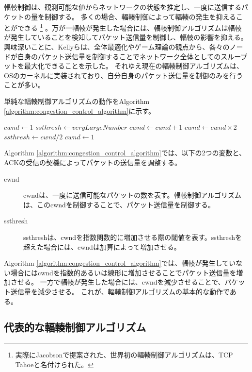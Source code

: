 \documentclass[a4paper,11pt]{jreport}
\newcommand{\algorithmref}[1]{Algorithm \ref{#1}}
\begin{document}
輻輳制御\cite{congestion-avoidance}は、観測可能な値からネットワークの状態を推定し、一度に送信するパケットの量を制御する。
多くの場合、輻輳制御によって輻輳の発生を抑えることができる
\footnote{実際にJacobson\cite{congestion-avoidance}で提案された、世界初の輻輳制御アルゴリズムは、TCP Tahoeと名付けられた。}
。万が一輻輳が発生した場合には、輻輳制御アルゴリズムは輻輳が発生していることを検知してパケット送信量を制御し、輻輳の影響を抑える。
興味深いことに、Kellyら\cite{kelly1998rate}は、全体最適化やゲーム理論の観点から、各々のノードが自身のパケット送信量を制御することでネットワーク全体としてのスループットを最大化できることを示した。
それゆえ現在の輻輳制御アルゴリズムは、OSのカーネルに実装されており、自分自身のパケット送信量を制御のみを行うことが多い。

単純な輻輳制御アルゴリズムの動作を\algorithmref{algorithm:congestion_control_algorithm}に示す。
\begin{algorithm}
  \caption{Basic Congestion Control Algorithm}
  \label{algorithm:congestion_control_algorithm}
  \begin{algorithmic}[1]
  \State $cwnd \gets 1$
  \State $ssthresh \gets veryLargeNumber$
            \State $cwnd \gets cwnd + 1$
        \Else
            \State $cwnd \gets cwnd \times 2$
        \EndIf
      \EndIf
          \State $ssthresh \gets cwnd / 2$
          \State $cwnd \gets 1$
      \EndIf
  \EndWhile
  \end{algorithmic}
\end{algorithm}
\algorithmref{algorithm:congestion_control_algorithm}では、以下の2つの変数と、ACKの受信の契機によってパケットの送信量を調整する。

\begin{description}
  \item[cwnd] cwndは、一度に送信可能なパケットの数を表す。輻輳制御アルゴリズムは、このcwndを制御することで、パケット送信量を制御する。
  \item[ssthresh] ssthreshは、cwndを指数関数的に増加させる際の閾値を表す。ssthreshを超えた場合には、cwndは加算によって増加させる。
\end{description}
\algorithmref{algorithm:congestion_control_algorithm}では、輻輳が発生していない場合にはcwndを指数的あるいは線形に増加させることでパケット送信量を増加させる。
一方で輻輳が発生した場合には、cwndを減少させることで、パケット送信量を減少させる。
これが、輻輳制御アルゴリズムの基本的な動作である。

\subsection{代表的な輻輳制御アルゴリズム}
\end{document}
